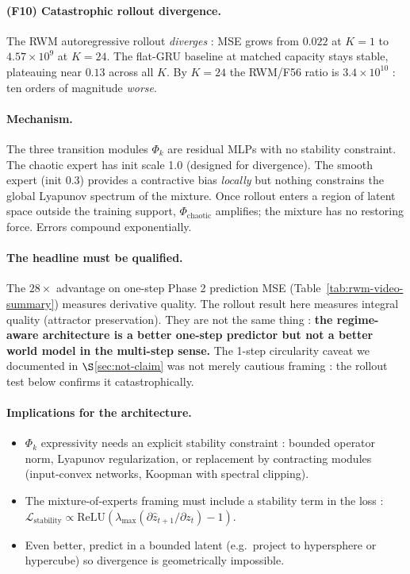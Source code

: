 \documentclass[11pt,a4paper]{article}
\begin{document}
\paragraph{(F10) Catastrophic rollout divergence.} The RWM autoregressive
rollout \emph{diverges} : MSE grows from $0.022$ at $K{=}1$ to
$4.57\times 10^9$ at $K{=}24$. The flat-GRU baseline at matched
capacity stays stable, plateauing near $0.13$ across all $K$. By
$K{=}24$ the RWM/F56 ratio is $3.4 \times 10^{10}$ : ten orders
of magnitude \emph{worse}.

\paragraph{Mechanism.} The three transition modules $\Phi_k$ are
residual MLPs with no stability constraint. The chaotic
expert has init scale 1.0 (designed for divergence). The smooth
expert (init 0.3) provides a contractive bias \emph{locally} but
nothing constrains the global Lyapunov spectrum of the mixture.
Once rollout enters a region of latent space outside the training
support, $\Phi_{\text{chaotic}}$ amplifies; the mixture has no
restoring force. Errors compound exponentially.

\paragraph{The headline must be qualified.} The $28\times$ advantage
on one-step Phase 2 prediction MSE (Table~\ref{tab:rwm-video-summary})
measures derivative quality. The rollout result here measures integral
quality (attractor preservation). They are not the same thing :
\textbf{the regime-aware architecture is a better one-step predictor
but not a better world model in the multi-step sense.} The 1-step
circularity caveat we documented in $\S$\ref{sec:not-claim} was
not merely cautious framing : the rollout test below confirms it
catastrophically.

\paragraph{Implications for the architecture.}
\begin{itemize}
\item $\Phi_k$ expressivity needs an explicit stability constraint :
  bounded operator norm, Lyapunov regularization, or replacement
  by contracting modules (input-convex networks, Koopman with
  spectral clipping).
\item The mixture-of-experts framing must include a stability term
  in the loss : $\mathcal{L}_{\text{stability}} \propto
  \mathrm{ReLU}(\lambda_{\max}(\partial \hat z_{t+1} / \partial z_t) - 1)$.
\item Even better, predict in a bounded latent (e.g.\ project to
  hypersphere or hypercube) so divergence is geometrically
  impossible.
\end{itemize}
\end{document}
